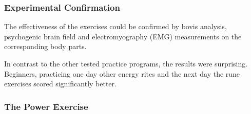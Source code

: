 \begin{frame}
  \frametitle{Experimental Confirmation}

  The effectiveness of the exercises could be confirmed by bovis analysis,
  psychogenic brain field and
  electromyography (EMG) measurements on the corresponding body parts.

  In contrast to the other tested practice programs, the results were surprising.
  Beginners, practicing one day other energy rites and the next day the rune exercises scored significantly better.
\end{frame}


\begin{frame}
  \frametitle{The Power Exercise}
  
  
\end{frame}
